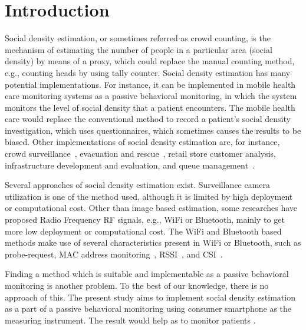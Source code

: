 \chapter{Introduction}\label{ch:introduction}


Social density estimation, or sometimes referred as crowd counting, is the mechanism of estimating the number of people in a particular area (social density) by means of a proxy, which could replace the manual counting method, e.g., counting heads by using tally counter. Social density estimation has many potential implementations. For instance, it can be implemented in mobile health care monitoring systems as a passive behavioral monitoring, in which the system monitors the level of social density that a patient encounters. The mobile health care would replace the conventional method to record a patient's social density investigation, which uses questionnaires, which sometimes causes the results to be biased.
Other implementations of social density estimation are, for instance, crowd surveillance~\cite{thesis050}, evacuation and rescue~\cite{thesis045}, retail store customer analysis, infrastructure development and evaluation, and queue management~\cite{thesis012}.

Several approaches of social density estimation exist. Surveillance camera utilization is one of the method used, although it is limited by high deployment or computational cost. Other than image based estimation, some researches have proposed Radio Frequency RF signals, e.g., WiFi or Bluetooth, mainly to get more low deployment or computational cost. The WiFi and Bluetooth based methods make use of several characteristics present in WiFi or Bluetooth, such as probe-request, MAC address monitoring~\cite{thesis008}, \ac{RSSI}~\cite{thesis046}, and \ac{CSI}~\cite{thesis051}.

Finding a method which is suitable and implementable as a passive behavioral monitoring is another problem. To the best of our knowledge, there is no approach of this.
The present study aims to implement social density estimation as a part of a passive behavioral monitoring using consumer smartphone as the measuring instrument. The result would help as to monitor patients . 
\cite{thesis015} %
\cite{thesis031} %

